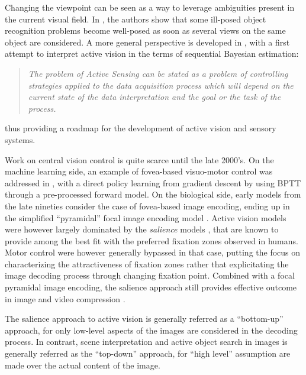 \documentclass[12pt,twoside,openright]{article}
\begin{document}
Changing the viewpoint can be seen as a way to leverage ambiguities present in the current visual field. In \cite{aloimonos1988active}, the authors show that some ill-posed object recognition problems become well-posed as soon as several views on the  same object are considered. A more general perspective is developed in \cite{bajcsy1988active}, with a first attempt to interpret active vision in the terms of sequential Bayesian estimation:
\begin{quote}
	\emph{The problem  of Active Sensing can be stated as a problem of controlling strategies 
		applied to the data acquisition process which will depend on the current state 
		of the data interpretation and  the  goal  or the  task of  the  process.}
\end{quote}
thus providing a roadmap for the development of active vision and sensory systems.

Work on central vision control is quite scarce until the late 2000's.
On the machine learning side, an example of fovea-based visuo-motor control was  addressed in \cite{schmidhuber1991learning}, with a direct policy learning from gradient descent by using BPTT through a pre-processed forward model. 
On the biological  side, early models from the late nineties  consider the case of fovea-based image encoding, ending up in the simplified ``pyramidal'' focal image encoding model \cite{kortum1996implementation}. Active vision models were however largely dominated by the \emph{salience} models \cite{itti2000saliency,itti2001computational,itti2005bayesian}, that are known to provide among the best fit with the preferred fixation zones observed in humans. 
Motor control were however generally bypassed in that case, putting the focus on characterizing the attractiveness of fixation zones rather that explicitating 
the image decoding process through changing fixation point.
Combined with a focal pyramidal image encoding, the salience approach  still provides effective outcome in image and video compression  \cite{wang2003foveation,guo2010novel}.


The salience approach to active vision is generally referred as a ``bottom-up'' approach, for only low-level aspects of the images are considered in the decoding process. In contrast, scene interpretation and active object search in images is generally referred as the ``top-down'' approach, for ``high level'' assumption are made over the actual content of the image. 
\end{document}
